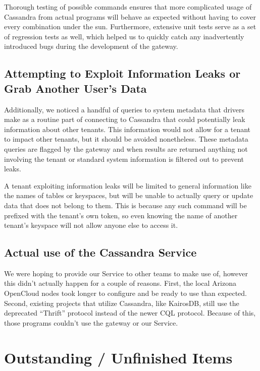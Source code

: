 \documentclass[11pt,notitlepage]{report}
\begin{document}
Thorough testing of possible commands ensures that more complicated usage of Cassandra from actual programs will behave as expected without having to cover every combination under the sun. Furthermore, extensive unit tests serve as a set of regression tests as well, which helped us to quickly catch any inadvertently introduced bugs during the development of the gateway.

\section*{Attempting to Exploit Information Leaks or Grab Another User's Data}

Additionally, we noticed a handful of queries to system metadata that drivers make as a routine part of connecting to Cassandra that could potentially leak information about other tenants. This information would not allow for a tenant to impact other tenants, but it should be avoided nonetheless. These metadata queries are flagged by the gateway and when results are returned anything not involving the tenant or standard system information is filtered out to prevent leaks.

A tenant exploiting information leaks will be limited to general information like the names of tables or keyspaces, but will be unable to actually query or update data that does not belong to them. This is because any such command will be prefixed with the tenant's own token, so even knowing the name of another tenant's keyspace will not allow anyone else to access it.


\section*{Actual use of the Cassandra Service}

We were hoping to provide our Service to other teams to make use of, however this didn't actually happen for a couple of reasons. First, the local Arizona OpenCloud nodes took longer to configure and be ready to use than expected. Second, existing projects that utilize Cassandra, like KairosDB, still use the deprecated ``Thrift'' protocol instead of the newer CQL protocol. Because of this, those programs couldn't use the gateway or our Service.


\chapter*{Outstanding / Unfinished Items}
\end{document}
